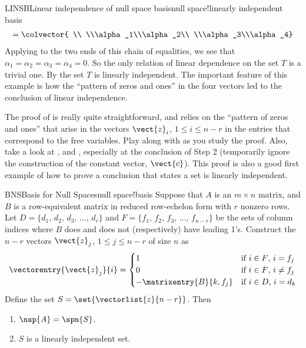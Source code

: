 \begin{example}{LINSB}{Linear independence of null space basis}{null space!linearly independent basis}
\begin{align*}
=
\colvector{ \\ \\\alpha_1\\\alpha_2\\ \\\alpha_3\\\alpha_4}
\end{align*}
%
Applying  to the two ends of this chain of equalities, we see that $\alpha_1=\alpha_2=\alpha_3=\alpha_4=0$.  So the only relation of linear dependence on the set $T$ is a trivial one.  By  the set $T$ is linearly independent.  The important feature of this example is how the ``pattern of zeros and ones'' in the four vectors led to the conclusion of linear independence.
%
\end{example}
%
The proof of  is really quite straightforward, and relies on the ``pattern of zeros and ones'' that arise in the vectors $\vect{z}_i$, $1\leq i\leq n-r$ in the entries that correspond to the free variables.  Play along with  as you study the proof.   Also, take a look at ,  and , especially at the conclusion of Step 2 (temporarily ignore the construction of the constant vector, $\vect{c}$).  This proof is also a good first example of how to prove a conclusion that states a set is linearly independent.
%
\begin{theorem}{BNS}{Basis for Null Spaces}{null space!basis}
Suppose that $A$ is an $m\times n$ matrix, and $B$ is a row-equivalent matrix in reduced row-echelon form with $r$ nonzero rows.  Let $D=\{d_1,\,d_2,\,d_3,\,\ldots,\,d_r\}$ and $F=\{f_1,\,f_2,\,f_3,\,\ldots,\,f_{n-r}\}$ be the sets of column indices where $B$ does and does not (respectively) have leading 1's.  Construct the $n-r$ vectors $\vect{z}_j$, $1\leq j\leq n-r$ of size $n$ as
%
\begin{equation*}
\vectorentry{\vect{z}_j}{i}=
\begin{cases}
1&\text{if $i\in F$, $i=f_j$}\\
0&\text{if $i\in F$, $i\neq f_j$}\\
-\matrixentry{B}{k,f_j}&\text{if $i\in D$, $i=d_k$}
\end{cases}
\end{equation*}
%
Define the set $S=\set{\vectorlist{z}{n-r}}$.  Then
%
\begin{enumerate}
\item $\nsp{A}=\spn{S}$.
\item $S$ is a linearly independent set.
\end{enumerate}
%
\end{theorem}
